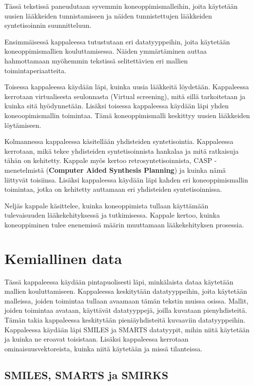 \documentclass[finnish,twoside,censored,tkt,sw-line]{HYthesisML}
\begin{document}
Tässä tekstissä paneudutaan syvemmin koneoppimismalleihin, joita käytetään uusien lääkkeiden tunnistamiseen ja näiden tunnistettujen lääkkeiden syntetisoinnin suunnitteluun.

Ensimmäisessä kappaleessa tutustutaan eri datatyyppeihin, joita käytetään koneoppimismallien kouluttamisessa.
Näiden ymmärtäminen auttaa hahmottamaan myöhemmin tekstissä selitettävien eri mallien toimintaperiaatteita.

Toisessa kappaleessa käydään läpi, kuinka uusia lääkkeitä löydetään.
Kappaleessa kerrotaan virtualisesta seulonnasta (Virtual screening), mitä sillä tarkoitetaan ja kuinka sitä hyödynnetään.
Lisäksi toisessa kappaleessa käydään läpi yhden koneoopimismallin toimintaa.
Tämä koneoppimismalli keskittyy uusien lääkkeiden löytämiseen.

Kolmannessa kappaleessa käsitellään yhdisteiden syntetisointia.
Kappaleessa kerrotaan, mikä tekee yhdisteiden syntetisoinnista hankalaa ja mitä ratkaisuja tähän on kehitetty.
Kappale myös kertoo retrosyntetisoinnista, CASP -menetelmistä (\textbf{Computer Aided Synthesis Planning}) ja kuinka nämä liittyvät toisiinsa.
Lisäksi kappaleessa käydään läpi kahden eri koneoppimismallin toimintaa, jotka on kehitetty auttamaan eri yhdisteiden syntetisoinnissa.

Neljäs kappale käsittelee, kuinka koneoppimista tullaan käyttämään tulevaisuuden lääkekehityksessä ja tutkimisessa.
Kappale kertoo, kuinka koneoppiminen tulee enenemissä määrin muuttamaan lääkekehityksen prosessia.

\chapter{Kemiallinen data}

Tässä kappaleessa käydään pintapuolisesti läpi, minkälaista dataa käytetään mallien kouluttamiseen.
Kappaleessa keskitytään datatyyppeihin, joita käytetään malleissa, joiden toimintaa tullaan avaamaan tämän tekstin muissa osissa.
Mallit, joiden toimintaa avataan, käyttävät datatyyppejä, joilla kuvataan pienyhdisteitä.
Tämän takia kappaleessa keskitytään pieniäyhdisteitä kuvaaviin datatyyppeihin.
Kappaleessa käydään läpi SMILES ja SMARTS datatyypit, mihin niitä käytetään ja kuinka ne eroavat toisistaan.
Lisäksi kappaleessa kerrotaan ominaisuusvektoreista, kuinka niitä käytetään ja missä tilanteissa.

\section{SMILES, SMARTS ja SMIRKS}
\end{document}
